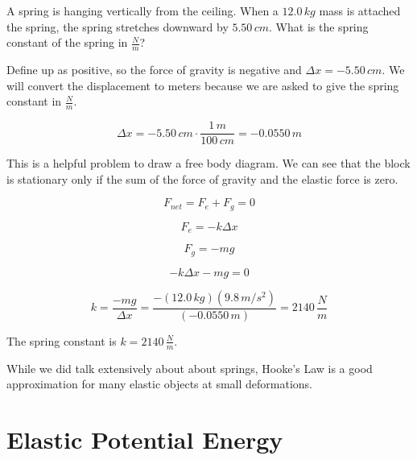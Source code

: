 \documentclass[12pt]{book}
\begin{document}
\begin{exampleblock}

A spring is hanging vertically from the ceiling. When a $12.0 \, kg$ mass is attached the spring, the spring stretches downward by $5.50 \, cm$. What is the spring constant of the spring in $\frac{N}{m}$?

\hspace{10pt}

 Define up as positive, so the force of gravity is negative and $\Delta x = -5.50 \, cm$. We will convert the displacement to meters because we are asked to give the spring constant in $\frac{N}{m}$.

\begin{equation}
\Delta x = -5.50 \, cm \cdot \frac{1 \, m}{100 \, cm} = -0.0550 \, m
\end{equation}

This is a helpful problem to draw a free body diagram. We can see that the block is stationary only if the sum of the force of gravity and the elastic force is zero.

\begin{equation}
F_{net} = F_e + F_g = 0
\end{equation}

\begin{equation}
F_e = -k \Delta x
\end{equation}

\begin{equation}
F_g = -mg
\end{equation}

\begin{equation}
-k \Delta x - mg = 0
\end{equation}

\begin{equation}
k = \frac{-mg}{\Delta x} = \frac{-(12.0 \, kg) (9.8 \, m/s^2)}{(-0.0550 \, m)} = 2140 \, \frac{N}{m}
\end{equation}

The spring constant is $k = 2140 \, \frac{N}{m}$.

\end{exampleblock}

While we did talk extensively about about springs, Hooke's Law is a good approximation for many elastic objects at small deformations. 

\section{Elastic Potential Energy}
\end{document}
